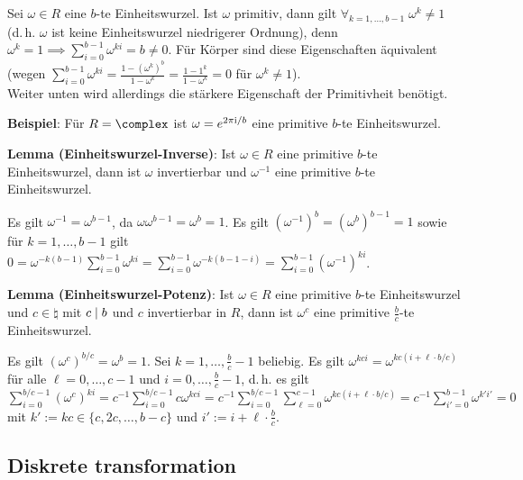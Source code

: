 Sei $\omega \in R$ eine $b$-te Einheitswurzel.
Ist $\omega$ primitiv, dann gilt
$\forall_{k=1,\dotsc,b-1}\; \omega^k \not= 1$
(d.\,h. $\omega$ ist keine Einheitswurzel niedrigerer Ordnung),
denn $\omega^k = 1 \implies \sum_{i=0}^{b-1} \omega^{ki} = b \not= 0$.
Für Körper sind diese Eigenschaften äquivalent
(wegen $\sum_{i=0}^{b-1} \omega^{ki} = \frac{1 - (\omega^k)^b}{1 - \omega^k}
= \frac{1 - 1^k}{1 - \omega^k} = 0$ für $\omega^k \not= 1$).\\
Weiter unten wird allerdings die stärkere Eigenschaft der Primitivheit benötigt.

\textbf{Beispiel}:
Für $R = \complex$ ist $\omega = e^{2\pi\mathrm{i}/b}$ eine primitive $b$-te Einheitswurzel.

\textbf{Lemma (Einheitswurzel-Inverse)}:
Ist $\omega \in R$ eine primitive $b$-te Einheitswurzel,
dann ist $\omega$ invertierbar und $\omega^{-1}$ eine primitive $b$-te Einheitswurzel.

\begin{Beweis}
    Es gilt $\omega^{-1} = \omega^{b-1}$, da
    $\omega \omega^{b-1} = \omega^b = 1$.
    Es gilt $(\omega^{-1})^b = (\omega^b)^{b-1} = 1$ sowie für $k = 1, \dotsc, b-1$ gilt
    $0 = \omega^{-k(b-1)} \sum_{i=0}^{b-1} \omega^{ki}
    = \sum_{i=0}^{b-1} \omega^{-k(b-1-i)}
    = \sum_{i=0}^{b-1} (\omega^{-1})^{ki}$.
\end{Beweis}

\textbf{Lemma (Einheitswurzel-Potenz)}:
Ist $\omega \in R$ eine primitive $b$-te Einheitswurzel und $c \in \natural$ mit $c \mid b$
und $c$ invertierbar in $R$,
dann ist $\omega^c$ eine primitive $\frac{b}{c}$-te Einheitswurzel.

\begin{Beweis}
    Es gilt $(\omega^c)^{b/c} = \omega^b = 1$.
    Sei $k = 1, \dotsc, \frac{b}{c}-1$ beliebig.
    Es gilt $\omega^{kci} = \omega^{kc(i+\ell\cdot b/c)}$ für alle $\ell = 0, \dotsc, c-1$
    und $i = 0, \dotsc, \frac{b}{c} - 1$,
    d.\,h. es gilt\\
    $\sum_{i=0}^{b/c-1} (\omega^c)^{ki}
    = c^{-1} \sum_{i=0}^{b/c-1} c \omega^{kci}
    = c^{-1} \sum_{i=0}^{b/c-1} \sum_{\ell=0}^{c-1} \omega^{kc(i+\ell\cdot b/c)}
    = c^{-1} \sum_{i'=0}^{b-1} \omega^{k'i'} = 0$\\
    mit $k' := kc \in \{c, 2c, \dotsc, b - c\}$ und
    $i' := i + \ell \cdot \frac{b}{c}$.
\end{Beweis}

\pagebreak

\subsection{%
    Diskrete transformation%
}

